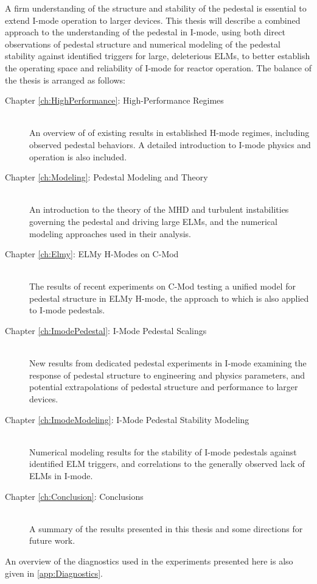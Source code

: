 A firm understanding of the structure and stability of the pedestal is essential to extend I-mode operation to larger devices.  This thesis will describe a combined approach to the understanding of the pedestal in I-mode, using both direct observations of pedestal structure and numerical modeling of the pedestal stability against identified triggers for large, deleterious ELMs, to better establish the operating space and reliability of I-mode for reactor operation.  The balance of the thesis is arranged as follows:

\begin{description}
 \item[Chapter \ref{ch:HighPerformance}: High-Performance Regimes] \hfill \\
 An overview of of existing results in established H-mode regimes, including observed pedestal behaviors.  A detailed introduction to I-mode physics and operation is also included.
 \item[Chapter \ref{ch:Modeling}: Pedestal Modeling and Theory] \hfill \\
 An introduction to the theory of the MHD and turbulent instabilities governing the pedestal and driving large ELMs, and the numerical modeling approaches used in their analysis.
 \item[Chapter \ref{ch:Elmy}: ELMy H-Modes on C-Mod] \hfill \\
 The results of recent experiments on C-Mod testing a unified model for pedestal structure in ELMy H-mode, the approach to which is also applied to I-mode pedestals.
 \item[Chapter \ref{ch:ImodePedestal}: I-Mode Pedestal Scalings] \hfill \\
 New results from dedicated pedestal experiments in I-mode examining the response of pedestal structure to engineering and physics parameters, and potential extrapolations of pedestal structure and performance to larger devices.
 \item[Chapter \ref{ch:ImodeModeling}: I-Mode Pedestal Stability Modeling] \hfill \\
 Numerical modeling results for the stability of I-mode pedestals against identified ELM triggers, and correlations to the generally observed lack of ELMs in I-mode.
 \item[Chapter \ref{ch:Conclusion}: Conclusions] \hfill \\
 A summary of the results presented in this thesis and some directions for future work.
\end{description}

\noindent An overview of the diagnostics used in the experiments presented here is also given in \cref{app:Diagnostics}.\nicechapterending



 